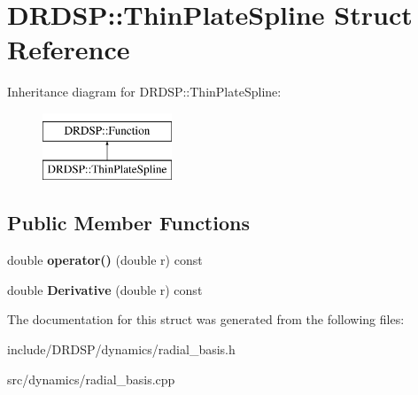 \hypertarget{struct_d_r_d_s_p_1_1_thin_plate_spline}{\section{D\-R\-D\-S\-P\-:\-:Thin\-Plate\-Spline Struct Reference}
\label{struct_d_r_d_s_p_1_1_thin_plate_spline}
}
Inheritance diagram for D\-R\-D\-S\-P\-:\-:Thin\-Plate\-Spline\-:\begin{figure}[H]
\begin{center}
\leavevmode
\includegraphics[height=2.000000cm]{struct_d_r_d_s_p_1_1_thin_plate_spline}
\end{center}
\end{figure}
\subsection*{Public Member Functions}
\begin{DoxyCompactItemize}
\item 
\hypertarget{struct_d_r_d_s_p_1_1_thin_plate_spline_a0282d868aa5e4f4cb077ed61dd343a0a}{double {\bfseries operator()} (double r) const }\label{struct_d_r_d_s_p_1_1_thin_plate_spline_a0282d868aa5e4f4cb077ed61dd343a0a}

\item 
\hypertarget{struct_d_r_d_s_p_1_1_thin_plate_spline_a42377bcfa0b624e7dc2569a411d06b19}{double {\bfseries Derivative} (double r) const }\label{struct_d_r_d_s_p_1_1_thin_plate_spline_a42377bcfa0b624e7dc2569a411d06b19}

\end{DoxyCompactItemize}


The documentation for this struct was generated from the following files\-:\begin{DoxyCompactItemize}
\item 
include/\-D\-R\-D\-S\-P/dynamics/radial\-\_\-basis.\-h\item 
src/dynamics/radial\-\_\-basis.\-cpp\end{DoxyCompactItemize}
